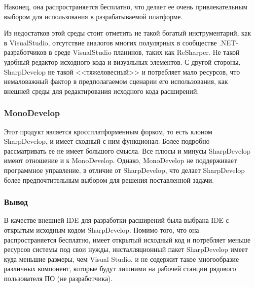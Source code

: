 Наконец, она распространяется бесплатно, что делает ее очень привлекательным выбором для использования в разрабатываемой платформе.

Из недостатков этой среды стоит отметить не такой богатый инструментарий, как в VisualStudio, отсутствие аналогов многих полулярных в сообществе .NET-разработчиков в среде  VisualStudio планинов, таких как ReSharper. Не такой удобный редактор исходного кода и визуальных элементов. С другой стороны, SharpDevelop не такой <<тяжеловесный>> и потребляет мало ресурсов, что немаловажный фактор в предполагаемом сценарии его использования, как внешней среды для редактирования исходного кода расширений.

\subsubsection{MonoDevelop}

Этот продукт является кроссплатформенным форком, то есть клоном SharpDevelop, и имеет сходный с ним функционал. Более подробно рассматривать ее не имеет большого смысла. Все плюсы и минусы SharpDevelop имеют отношение и к MonoDevelop. Однако, MonoDevelop не поддерживает программное управление, в отличие от SharpDevelop, что делает SharpDevelop более предпочтительным выбором для решения поставленной задачи.

\subsubsection{Вывод}

В качестве внешней IDE для разработки расширений была выбрана IDE с открытым исходным кодом SharpDevelop. Помимо того, что она распространяется бесплатно, имеет открытый исходный код и потребляет меньше ресурсов системы под свои нужды, инсталляционный пакет SharpDevelop имеет куда меньшие размеры, чем Visual Studio, и не содержит такое многообразие различных компонент, которые будут лишними на рабочей станции рядового пользователя ПО (не разработчика).

\pagebreak
